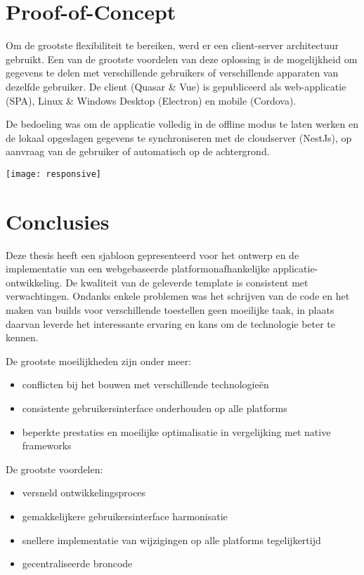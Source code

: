 \documentclass[a0,portrait]{hogent-poster}
\begin{document}
\begin{multicols}{2}
\section{Proof-of-Concept}
Om de grootste flexibiliteit te bereiken, werd er een client-server architectuur gebruikt. Een van de grootste voordelen van deze oplossing is de mogelijkheid om gegevens te delen met verschillende gebruikers of verschillende apparaten van dezelfde gebruiker. De client (Quasar \& Vue) is gepubliceerd als web-applicatie (SPA), Linux \& Windows Desktop (Electron) en mobile (Cordova).

De bedoeling was om de applicatie volledig in de offline modus te laten werken en de lokaal opgeslagen gegevens te synchroniseren met de cloudserver (NestJs), op aanvraag van de gebruiker of automatisch op de achtergrond.

\begin{center}
  \captionsetup{type=figure}
  \texttt{[image: responsive]}
\end{center}



\section{Conclusies}

Deze thesis heeft een sjabloon gepresenteerd voor het ontwerp en de implementatie van een webgebaseerde platformonafhankelijke applicatie-ontwikkeling. De kwaliteit van de geleverde template is consistent met verwachtingen. Ondanks enkele problemen was het schrijven van de code en het maken van builds voor verschillende toestellen geen moeilijke taak, in plaats daarvan leverde het interessante ervaring en kans om de technologie beter te kennen.

De grootste moeilijkheden zijn onder meer:
\begin{itemize}
    \item conflicten bij het bouwen met verschillende technologieën
    \item consistente gebruikersinterface onderhouden op alle platforms
    \item beperkte prestaties en moeilijke optimalisatie in vergelijking met native frameworks
\end{itemize}


De grootste voordelen:
\begin{itemize}
    \item versneld ontwikkelingsproces
    \item gemakkelijkere gebruikersinterface harmonisatie
    \item snellere implementatie van wijzigingen op alle platforms tegelijkertijd
    \item gecentraliseerde broncode


\end{itemize}
\end{multicols}
\end{document}
